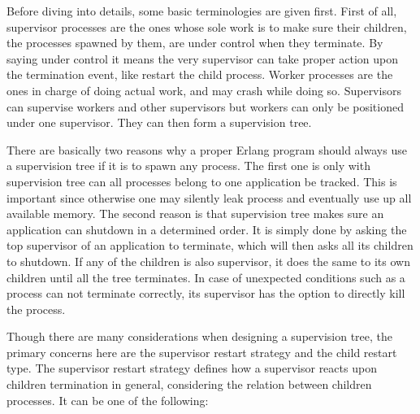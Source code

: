 Before diving into details, some basic terminologies are given first. First of all, supervisor processes are the ones whose sole work is to make sure their children, the processes spawned by them, are under control when they terminate. By saying under control it means the very supervisor can take proper action upon the termination event, like restart the child process. Worker processes are the ones in charge of doing actual work, and may crash while doing so. Supervisors can supervise workers and other supervisors but workers can only be positioned under one supervisor. They can then form a supervision tree.

There are basically two reasons why a proper Erlang program should always use a supervision tree if it is to spawn any process. The first one is only with supervision tree can all processes belong to one application be tracked. This is important since otherwise one may silently leak process and eventually use up all available memory. The second reason is that supervision tree makes sure an application can shutdown in a determined order. It is simply done by asking the top supervisor of an application to terminate, which will then asks all its children to shutdown. If any of the children is also supervisor, it does the same to its own children until all the tree terminates. In case of unexpected conditions such as a process can not terminate correctly, its supervisor has the option to directly kill the process.

Though there are many considerations when designing a supervision tree, the primary concerns here are the supervisor restart strategy and the child restart type. The supervisor restart strategy defines how a supervisor reacts upon children termination in general, considering the relation between children processes. It can be one of the following:

